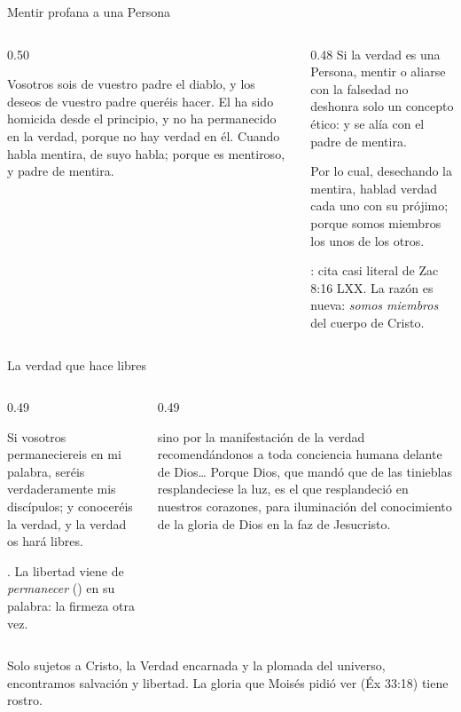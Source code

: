 \begin{frame}{Mentir profana a una Persona}
\begin{columns}[t,onlytextwidth]
\begin{column}{0.50\textwidth}
\begin{cita}Vosotros sois de vuestro padre el diablo, y los deseos de vuestro padre queréis hacer. El ha sido homicida desde el principio, y no ha permanecido en la verdad, porque no hay verdad en él. Cuando habla mentira, de suyo habla; porque es mentiroso, y padre de mentira.\end{cita}
\end{column}
\begin{column}{0.48\textwidth}\small
Si la verdad es una Persona, mentir o aliarse con la falsedad no deshonra solo un concepto ético:  y se alía con el padre de mentira.
\begin{cita}Por lo cual, desechando la mentira, hablad verdad cada uno con su prójimo; porque somos miembros los unos de los otros.\end{cita}
\scriptsize{}: cita casi literal de Zac 8:16 LXX. La razón es nueva: \emph{somos miembros} del cuerpo de Cristo.
\end{column}
\end{columns}
\end{frame}

\begin{frame}{La verdad que hace libres}
\begin{columns}[t,onlytextwidth]
\begin{column}{0.49\textwidth}
\begin{cita}Si vosotros permaneciereis en mi palabra, seréis verdaderamente mis discípulos; y conoceréis la verdad, y la verdad os hará libres.\end{cita}
\scriptsize{}. La libertad viene de \emph{permanecer} () en su palabra: la firmeza otra vez.
\end{column}
\begin{column}{0.49\textwidth}
\begin{cita}sino por la manifestación de la verdad recomendándonos a toda conciencia humana delante de Dios\ldots{} Porque Dios, que mandó que de las tinieblas resplandeciese la luz, es el que resplandeció en nuestros corazones, para iluminación del conocimiento de la gloria de Dios en la faz de Jesucristo.\end{cita}
\end{column}
\end{columns}\par\smallskip
\small\RaggedRight Solo sujetos a Cristo, la Verdad encarnada y la plomada del universo, encontramos salvación y libertad. La gloria que Moisés pidió ver (Éx 33:18) tiene rostro.
\end{frame}

